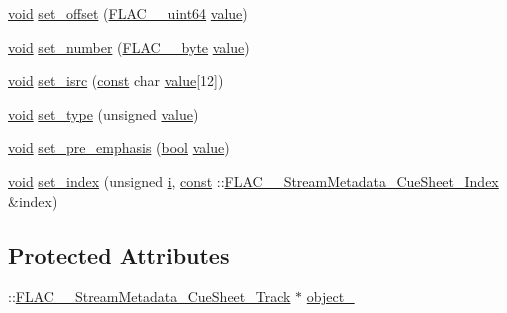 \begin{DoxyCompactItemize}
\item 
\hyperlink{sound_8c_ae35f5844602719cf66324f4de2a658b3}{void} \hyperlink{class_f_l_a_c_1_1_metadata_1_1_cue_sheet_1_1_track_a78af8923ef6543c4393458166a12b46e}{set\+\_\+offset} (\hyperlink{ordinals_8h_aa78c8c70a3eb8a58af7436f278acde8e}{F\+L\+A\+C\+\_\+\+\_\+uint64} \hyperlink{lib_2expat_8h_a4a30a13b813682e68c5b689b45c65971}{value})
\item 
\hyperlink{sound_8c_ae35f5844602719cf66324f4de2a658b3}{void} \hyperlink{class_f_l_a_c_1_1_metadata_1_1_cue_sheet_1_1_track_a80a7fc4efe72021a43e96c170457ec44}{set\+\_\+number} (\hyperlink{ordinals_8h_a5eb569b12d5b047cdacada4d57924ee3}{F\+L\+A\+C\+\_\+\+\_\+byte} \hyperlink{lib_2expat_8h_a4a30a13b813682e68c5b689b45c65971}{value})
\item 
\hyperlink{sound_8c_ae35f5844602719cf66324f4de2a658b3}{void} \hyperlink{class_f_l_a_c_1_1_metadata_1_1_cue_sheet_1_1_track_a6e86dff01b47678d5f0daa4d060c067d}{set\+\_\+isrc} (\hyperlink{getopt1_8c_a2c212835823e3c54a8ab6d95c652660e}{const} char \hyperlink{lib_2expat_8h_a4a30a13b813682e68c5b689b45c65971}{value}\mbox{[}12\mbox{]})
\item 
\hyperlink{sound_8c_ae35f5844602719cf66324f4de2a658b3}{void} \hyperlink{class_f_l_a_c_1_1_metadata_1_1_cue_sheet_1_1_track_a36346d75b75c2f3b55d861826f9e032d}{set\+\_\+type} (unsigned \hyperlink{lib_2expat_8h_a4a30a13b813682e68c5b689b45c65971}{value})
\item 
\hyperlink{sound_8c_ae35f5844602719cf66324f4de2a658b3}{void} \hyperlink{class_f_l_a_c_1_1_metadata_1_1_cue_sheet_1_1_track_a0b62ce4e977d5ee927fe770020caba88}{set\+\_\+pre\+\_\+emphasis} (\hyperlink{mac_2config_2i386_2lib-src_2libsoxr_2soxr-config_8h_abb452686968e48b67397da5f97445f5b}{bool} \hyperlink{lib_2expat_8h_a4a30a13b813682e68c5b689b45c65971}{value})
\item 
\hyperlink{sound_8c_ae35f5844602719cf66324f4de2a658b3}{void} \hyperlink{class_f_l_a_c_1_1_metadata_1_1_cue_sheet_1_1_track_aa8a70d722043e1f4bdea0c3c837c3472}{set\+\_\+index} (unsigned \hyperlink{checksum_8c_ab80e330a3bc9e38c1297fe17381e92b4}{i}, \hyperlink{getopt1_8c_a2c212835823e3c54a8ab6d95c652660e}{const} \+::\hyperlink{struct_f_l_a_c_____stream_metadata___cue_sheet___index}{F\+L\+A\+C\+\_\+\+\_\+\+Stream\+Metadata\+\_\+\+Cue\+Sheet\+\_\+\+Index} \&index)
\end{DoxyCompactItemize}
\subsection*{Protected Attributes}
\begin{DoxyCompactItemize}
\item 
\+::\hyperlink{struct_f_l_a_c_____stream_metadata___cue_sheet___track}{F\+L\+A\+C\+\_\+\+\_\+\+Stream\+Metadata\+\_\+\+Cue\+Sheet\+\_\+\+Track} $\ast$ \hyperlink{class_f_l_a_c_1_1_metadata_1_1_cue_sheet_1_1_track_ab626deaf593475e4499c50594ed09b7f}{object\+\_\+}
\end{DoxyCompactItemize}


